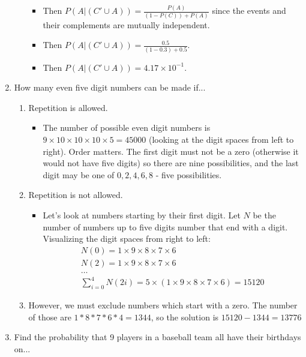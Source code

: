 \documentclass{article}
\begin{document}
\begin{enumerate}
\begin{enumerate}
\begin{itemize}
        \item Then $P(A | (C' \cup A)) = \frac{P(A)}{(1 - P(C)) + P(A)}$ since the events and their complements are mutually independent.
        \item Then $P(A | (C' \cup A)) = \frac{0.5}{(1 - 0.3) + 0.5}$.
        \item Then $P(A | (C' \cup A)) = 4.17 \times 10^{-1}$.
        \end{itemize}
    \end{enumerate}
\item How many even five digit numbers can be made if...
    \begin{enumerate}
    \item Repetition is allowed.
        \begin{itemize}
        \item The number of possible even digit numbers is $9 \times 10 \times 10 \times 10 \times 5 = 45000$ (looking at the digit spaces from left to right). Order matters. The first digit must not be a zero (otherwise it would not have five digits) so there are nine possibilities, and the last digit may be one of $0, 2, 4, 6, 8$ - five possibilities.
        \end{itemize}
    \item Repetition is not allowed.
        \begin{itemize}
        \item Let's look at numbers starting by their first digit. Let $N$ be the number of numbers up to five digits number that end with a digit. Visualizing the digit spaces from right to left:
        \begin{equation}
        \begin{split}
            N(0) = 1 \times 9 \times 8 \times 7 \times 6 \\
            N(2) = 1 \times 9 \times 8 \times 7 \times 6 \\
            \ldots \\
            \sum\limits_{i=0}^4 N(2i) = 5 \times (1 \times 9 \times 8 \times 7 \times 6) = 15120
        \end{split}
        \end{equation}
        \end{itemize}
        \item However, we must exclude numbers which start with a zero. The number of those are $1 * 8 * 7 * 6 * 4 = 1344$, so the solution is $15120 - 1344 = 13776$
    \end{enumerate}
\item Find the probability that 9 players in a baseball team all have their birthdays on...

\end{enumerate}
\end{document}

